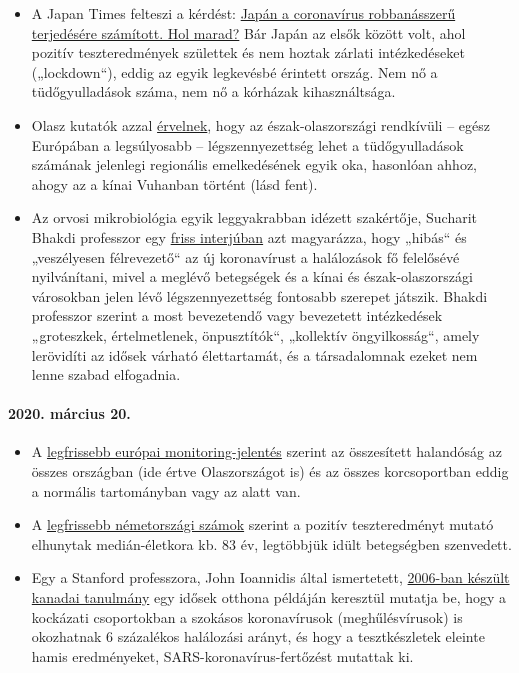 \begin{itemize}
\tightlist
\item
  A Japan Times felteszi a kérdést:
  \href{https://www.japantimes.co.jp/news/2020/03/20/national/coronavirus-explosion-expected-japan/}{Japán
  a coronavírus robbanásszerű terjedésére számított. Hol marad?} Bár
  Japán az elsők között volt, ahol pozitív teszteredmények születtek és
  nem hoztak zárlati intézkedéseket („lockdown``), eddig az egyik
  legkevésbé érintett ország. Nem nő a tüdőgyulladások száma, nem nő a
  kórházak kihasználtsága.
\item
  Olasz kutatók azzal
  \href{https://www.heise.de/tp/features/Feinstaubpartikel-als-Viren-Vehikel-4687454.html}{érvelnek},
  hogy az észak-olaszországi rendkívüli -- egész Európában a
  legsúlyosabb -- légszennyezettség lehet a tüdőgyulladások számának
  jelenlegi regionális emelkedésének egyik oka, hasonlóan ahhoz, ahogy
  az a kínai Vuhanban történt (lásd fent).
\item
  Az orvosi mikrobiológia egyik leggyakrabban idézett szakértője,
  Sucharit Bhakdi professzor egy
  \href{https://www.youtube.com/watch?v=JBB9bA-gXL4}{friss interjúban}
  azt magyarázza, hogy „hibás`` és „veszélyesen félrevezető`` az új
  koronavírust a halálozások fő felelősévé nyilvánítani, mivel a meglévő
  betegségek és a kínai és észak-olaszországi városokban jelen lévő
  légszennyezettség fontosabb szerepet játszik. Bhakdi professzor
  szerint a most bevezetendő vagy bevezetett intézkedések „groteszkek,
  értelmetlenek, önpusztítók``, „kollektív öngyilkosság``, amely
  lerövidíti az idősek várható élettartamát, és a társadalomnak ezeket
  nem lenne szabad elfogadnia.
\end{itemize}

\hypertarget{2020-muxe1rcius-20}{%
\paragraph{2020. március 20.}\label{2020-muxe1rcius-20}}

\begin{itemize}
\tightlist
\item
  A \href{https://www.euromomo.eu/index.html}{legfrissebb európai
  monitoring-jelentés} szerint az összesített halandóság az összes
  országban (ide értve Olaszországot is) és az összes korcsoportban
  eddig a normális tartományban vagy az alatt van.
\item
  A
  \href{https://de.wikipedia.org/wiki/COVID-19-Pandemie_in_Deutschland\#Todesf\%C3\%A4lle_in_den_Medien}{legfrissebb
  németországi számok} szerint a pozitív teszteredményt mutató elhunytak
  medián-életkora kb. 83 év, legtöbbjük idült betegségben szenvedett.
\item
  Egy a Stanford professzora, John Ioannidis által ismertetett,
  \href{https://www.ncbi.nlm.nih.gov/pmc/articles/PMC2095096/}{2006-ban
  készült kanadai tanulmány} egy idősek otthona példáján keresztül
  mutatja be, hogy a kockázati csoportokban a szokásos koronavírusok
  (meghűlésvírusok) is okozhatnak 6 százalékos halálozási arányt, és
  hogy a tesztkészletek eleinte hamis eredményeket,
  SARS-koronavírus-fertőzést mutattak ki.
\end{itemize}

